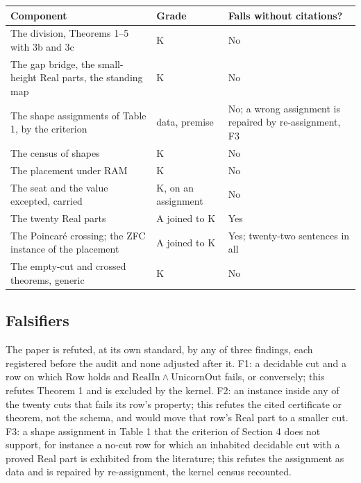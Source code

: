 \documentclass[10pt]{article}
\begin{document}
\begin{table}[!h]
\centering\scriptsize
\renewcommand{\arraystretch}{1.15}
\begin{tabularx}{\columnwidth}{@{}L P{0.19\columnwidth} P{0.22\columnwidth}@{}}
\toprule
\textbf{Component} & \textbf{Grade} & \textbf{Falls without citations?} \\
\midrule
The division, Theorems 1--5 with 3b and 3c & K & No \\
The gap bridge, the small-height Real parts, the standing map & K & No \\
The shape assignments of Table 1, by the criterion & data, premise & No; a wrong assignment is repaired by re-assignment, F3 \\
The census of shapes & K & No \\
The placement under RAM & K & No \\
The seat and the value excepted, carried & K, on an assignment & No \\
The twenty Real parts & A joined to K & Yes \\
The Poincaré crossing; the ZFC instance of the placement & A joined to K & Yes; twenty-two sentences in all \\
The empty-cut and crossed theorems, generic & K & No \\
\bottomrule
\end{tabularx}
\end{table}

\hypertarget{falsifiers}{%
\subsection{Falsifiers}\label{falsifiers}}

The paper is refuted, at its own standard, by any of three findings,
each registered before the audit and none adjusted after it. F1: a
decidable cut and a row on which \(\mathrm{Row}\) holds and
\(\mathrm{RealIn} \wedge \mathrm{UnicornOut}\) fails, or conversely;
this refutes Theorem 1 and is excluded by the kernel. F2: an instance
inside any of the twenty cuts that fails its row's property; this
refutes the cited certificate or theorem, not the schema, and would move
that row's Real part to a smaller cut. F3: a shape assignment in Table 1
that the criterion of Section 4 does not support, for instance a no-cut
row for which an inhabited decidable cut with a proved Real part is
exhibited from the literature; this refutes the assignment as data and
is repaired by re-assignment, the kernel census recounted.
\end{document}
